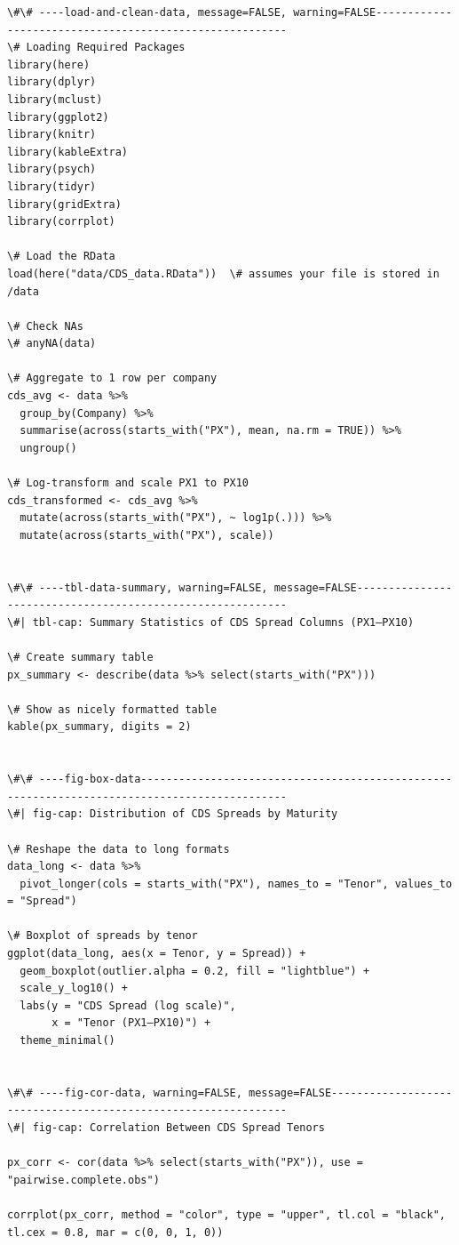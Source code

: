 \documentclass[
  letterpaper,
  DIV=11,
  numbers=noendperiod]{scrartcl}
\begin{document}
\begin{verbatim}
\#\# ----load-and-clean-data, message=FALSE, warning=FALSE--------------------------------------------------------
\# Loading Required Packages
library(here)
library(dplyr)
library(mclust)
library(ggplot2)
library(knitr)
library(kableExtra)
library(psych)
library(tidyr)
library(gridExtra)
library(corrplot)

\# Load the RData
load(here("data/CDS_data.RData"))  \# assumes your file is stored in /data

\# Check NAs
\# anyNA(data)

\# Aggregate to 1 row per company
cds_avg <- data %>%
  group_by(Company) %>%
  summarise(across(starts_with("PX"), mean, na.rm = TRUE)) %>%
  ungroup()

\# Log-transform and scale PX1 to PX10
cds_transformed <- cds_avg %>%
  mutate(across(starts_with("PX"), ~ log1p(.))) %>%
  mutate(across(starts_with("PX"), scale))


\#\# ----tbl-data-summary, warning=FALSE, message=FALSE-----------------------------------------------------------
\#| tbl-cap: Summary Statistics of CDS Spread Columns (PX1–PX10)

\# Create summary table
px_summary <- describe(data %>% select(starts_with("PX")))

\# Show as nicely formatted table
kable(px_summary, digits = 2)


\#\# ----fig-box-data---------------------------------------------------------------------------------------------
\#| fig-cap: Distribution of CDS Spreads by Maturity

\# Reshape the data to long formats
data_long <- data %>%
  pivot_longer(cols = starts_with("PX"), names_to = "Tenor", values_to = "Spread")

\# Boxplot of spreads by tenor
ggplot(data_long, aes(x = Tenor, y = Spread)) +
  geom_boxplot(outlier.alpha = 0.2, fill = "lightblue") +
  scale_y_log10() + 
  labs(y = "CDS Spread (log scale)",
       x = "Tenor (PX1–PX10)") +
  theme_minimal()


\#\# ----fig-cor-data, warning=FALSE, message=FALSE---------------------------------------------------------------
\#| fig-cap: Correlation Between CDS Spread Tenors

px_corr <- cor(data %>% select(starts_with("PX")), use = "pairwise.complete.obs")

corrplot(px_corr, method = "color", type = "upper", tl.col = "black", tl.cex = 0.8, mar = c(0, 0, 1, 0))



\end{verbatim}
\end{document}

